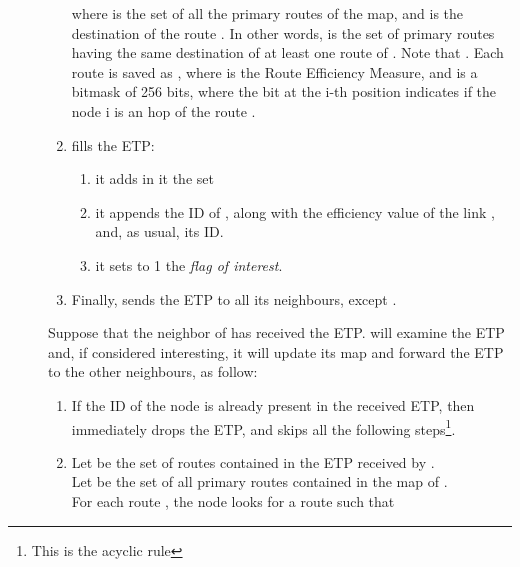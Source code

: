 \documentclass[a4paper]{article}
\begin{document}
\begin{description}
\begin{enumerate}
			where  is the set of all the primary routes of the map, and 
			 is the destination of the route . In
			other words,  is the set of primary routes having
			the same destination of at least one route of .
			Note that .
			Each
			route  is saved as , where  is the Route
			Efficiency Measure, and  is a bitmask of 256
			bits, where the bit at the i-th position indicates if
			the node i is an hop of the route .
		\item  fills the ETP: 
			\begin{enumerate}
				\item it adds in it the set 
				\item it appends the ID of , along with the efficiency
					value of the link , and, as usual, its ID.
				\item it sets to 1 the \emph{flag of interest}.
			\end{enumerate}
		\item Finally,  sends the ETP to all its neighbours, except .
		\end{enumerate}
		\label{ETPrule1}
		Suppose that the neighbor  of  has received the ETP. 
		will examine the ETP and, if considered interesting, it 
	will update its map and forward the ETP to the other neighbours, as
		follow:
		\begin{enumerate}
		\item If the ID of the node  is already present in the
			received ETP, then  immediately drops the ETP, and
			skips all the following steps\footnote{This is the acyclic
			rule}.
		\item Let  be the set of routes contained in the
			ETP received by .\\
			Let  be the set of all primary routes contained in the map of .\\
		For each route , the node  looks for 
		a route  such that 
		

\end{enumerate}
\end{description}
\end{document}

